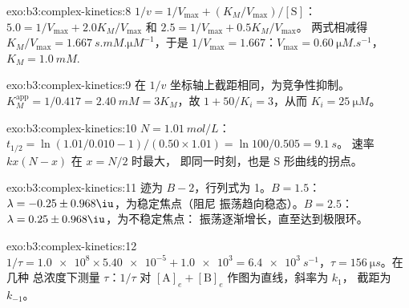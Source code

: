 \begin{solution}{exo:b3:complex-kinetics:8}
$1/v = 1/V_{\max} + (K_M/V_{\max})/[\mathrm S]$：$5.0 = 1/V_{\max} + 2.0K_M/V_{\max}$ 和 $2.5 = 1/V_{\max} + 0.5K_M/V_{\max}$。
两式相减得 $K_M/V_{\max} = \qty{1.667}{s.mM.\micro M^{-1}}$，于是 $1/V_{\max} = 1.667$：$V_{\max} = \qty{0.60}{\micro M.s^{-1}}$，
$K_M = \qty{1.0}{mM}$.
\end{solution}

\begin{solution}{exo:b3:complex-kinetics:9}
在 $1/v$ 坐标轴上截距相同，为竞争性抑制。$K_M^{\mathrm{app}} = 1/0.417 = \qty{2.40}{mM} = 3K_M$，故
$1 + 50/K_i = 3$，从而 $K_i = \qty{25}{\micro M}$。
\end{solution}

\begin{solution}{exo:b3:complex-kinetics:10}
$N = \qty{1.01}{mol/L}$：$t_{1/2} = \ln(1.01/0.010 - 1)/(0.50 \times 1.01) = \ln100/0.505 = \qty{9.1}{s}$。
速率 $kx(N - x)$ 在 $x = N/2$ 时最大，
即同一时刻，也是 S 形曲线的拐点。
\end{solution}

\begin{solution}{exo:b3:complex-kinetics:11}
迹为 $B - 2$，行列式为 1。$B = 1.5$：$\lambda = -0.25 \pm 0.968\iu$，为稳定焦点（阻尼
振荡趋向稳态）。$B = 2.5$：$\lambda = 0.25 \pm 0.968\iu$，为不稳定焦点：
振荡逐渐增长，直至达到极限环。
\end{solution}

\begin{solution}{exo:b3:complex-kinetics:12}
$1/\tau = \num{1.0e8} \times \num{5.40e-5} + \num{1.0e3} = \qty{6.4e3}{s^{-1}}$，$\tau = \qty{156}{\micro s}$。在几种
总浓度下测量 $\tau$：$1/\tau$ 对 $[\mathrm A]_e + [\mathrm B]_e$ 作图为直线，斜率为 $k_1$，
截距为 $k_{-1}$。
\end{solution}

